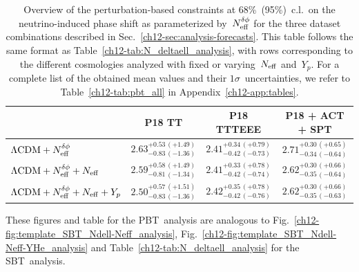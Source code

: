 \begin{table}
	\centering
	\begin{tabular}{l c c c}
			\toprule
														& P18 TT										& P18 TTTEEE									& P18 + ACT + SPT								\\
			\midrule[0.065em]
		$\Lambda\mathrm{CDM} + N_\mathrm{eff}^{\delta\phi}$					& $2.63^{+0.53\, (+1.49)}_{-0.83\, (-1.36)}$	& $2.41^{+0.34\, (+0.79)}_{-0.42\, (-0.73)}$	& $2.71^{+0.30\, (+0.65)}_{-0.34\, (-0.64)}$	\\[4pt]
		$\Lambda\mathrm{CDM} + N_\mathrm{eff}^{\delta\phi} + N_\mathrm{eff}$ 		& $2.59^{+0.58\, (+1.49)}_{-0.81\, (-1.34)}$	& $2.41^{+0.33\, (+0.78)}_{-0.42\, (-0.74)}$	& $2.62^{+0.30\, (+0.66)}_{-0.35\, (-0.64)}$	\\[4pt]
		$\Lambda\mathrm{CDM} + N_\mathrm{eff}^{\delta\phi} + N_\mathrm{eff} + Y_p$	& $2.50^{+0.57\, (+1.51)}_{-0.83\, (-1.36)}$	& $2.42^{+0.35\, (+0.78)}_{-0.42\, (-0.76)}$	& $2.62^{+0.30\, (+0.66)}_{-0.35\, (-0.63)}$	\\[2pt]
			\bottomrule
	\end{tabular}
	\caption[Perturbation-based phase shift constraints]{Overview of the perturbation-based constraints at 68\%~(95\%)~c.l.\ on the neutrino-induced phase shift as parameterized by~$N_\mathrm{eff}^{\delta\phi}$ for the three dataset combinations described in Sec.~\ref{ch12-sec:analysis-forecasts}. This table follows the same format as Table~\ref{ch12-tab:N_deltaell_analysis}, with rows corresponding to the different cosmologies analyzed with fixed or varying~$N_\mathrm{eff}$ and~$Y_p$. For a complete list of the obtained mean values and their $1\sigma$~uncertainties, we refer to Table~\ref{ch12-tab:pbt_all} in Appendix~\ref{ch12-app:tables}.}
	\label{ch12-tab:N_deltaphi_analysis}
\end{table}
These figures and table for the PBT~analysis are analogous to Fig.~\ref{ch12-fig:template_SBT_Ndell-Neff_analysis}, Fig.~\ref{ch12-fig:template_SBT_Ndell-Neff-YHe_analysis} and Table~\ref{ch12-tab:N_deltaell_analysis} for the SBT~analysis.\medskip

